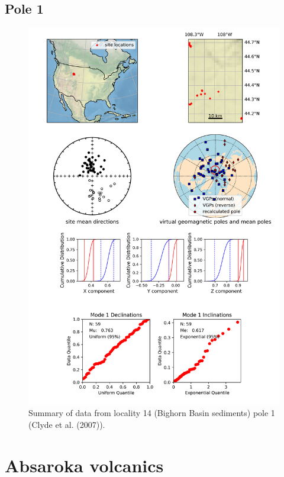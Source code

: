 \documentclass{article}
\begin{document}
\subsection{Pole 1}


\begin{figure}[H]
\centering
\includegraphics[width=5 in]{./14/1/pole_summary.png}
\caption{Summary of data from locality 14 (Bighorn Basin sediments) pole 1 (Clyde et al. (2007)).}
\end{figure}

\section{Absaroka volcanics}
\end{document}
